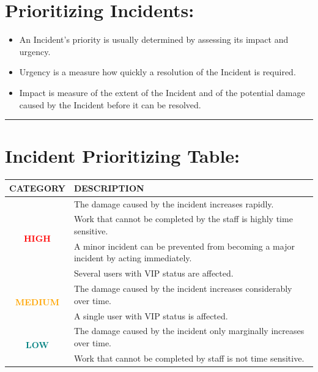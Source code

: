 \documentclass[british]{article}
\providecommand{\tabularnewline}{\\}
\providecommand{\tabularnewline}{\\}
\begin{document}
\section{Prioritizing Incidents:}
\begin{itemize}
\item An Incident's priority is usually determined by assessing its impact
and urgency. 
\item Urgency is a measure how quickly a resolution of the Incident is required. 
\item Impact is measure of the extent of the Incident and of the potential
damage caused by the Incident before it can be resolved. 
\end{itemize}
\rule[0.5ex]{0.75\columnwidth}{1pt}

\pagebreak{}

\section{Incident Prioritizing Table:}
\begin{center}
\begin{tabular}{|c||l|}
\hline 
\textbf{CATEGORY}  & \textbf{DESCRIPTION}\tabularnewline
\hline 
\hline 
\multirow{4}{*}{\textbf{\textcolor{red}{\Large{}HIGH}}} & The damage caused by the incident increases rapidly. \tabularnewline
\cline{2-2} 
 & Work that cannot be completed by the staff is highly time sensitive.\tabularnewline
\cline{2-2} 
 & A minor incident can be prevented from becoming a major incident by
acting immediately.\tabularnewline
\cline{2-2} 
 & Several users with VIP status are affected.\tabularnewline
\hline 
\multirow{2}{*}{\textbf{\textcolor{orange}{\Large{}MEDIUM}}} & The damage caused by the incident increases considerably over time. \tabularnewline
\cline{2-2} 
 & A single user with VIP status is affected. \tabularnewline
\hline 
\multirow{2}{*}{\textbf{\textcolor{teal}{\Large{}LOW}}} & The damage caused by the incident only marginally increases over time. \tabularnewline
\cline{2-2} 
 & Work that cannot be completed by staff is not time sensitive.\tabularnewline
\hline 
\end{tabular}
\par\end{center}
\end{document}
